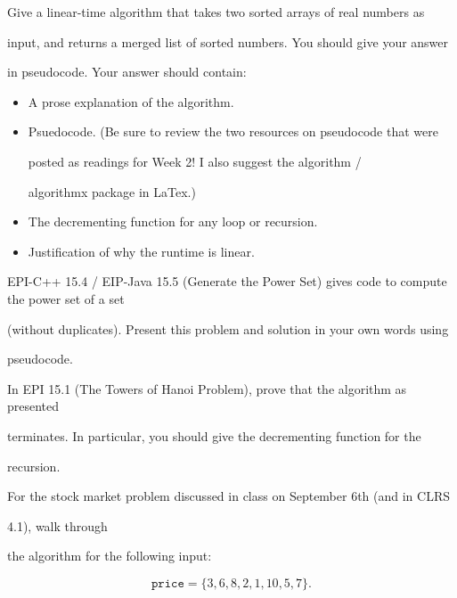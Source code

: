 \documentclass{article}
\author{TODO-Your Group Number and Names Here}
\date{due: 20 September 2019}
\begin{document}
\nextprob

Give a linear-time algorithm that takes two sorted arrays of real numbers as

input, and returns a merged list of sorted numbers.  You should give your answer

in pseudocode.    Your answer should contain:

\begin{itemize}

    \item A prose explanation of the algorithm.

    \item Psuedocode. (Be sure to review the two resources on pseudocode that were

        posted as readings for Week 2!  I also suggest the algorithm /

        algorithmx package in LaTex.)

    \item The decrementing function for any loop or recursion.

    \item Justification of why the runtime is linear.

\end{itemize}



\nextprob

EPI-C++ 15.4 / EIP-Java 15.5 (Generate the Power Set) gives code to compute the power set of a set

(without duplicates).  Present this problem and solution in your own words using

pseudocode.



\nextprob

In EPI 15.1 (The Towers of Hanoi Problem), prove that the algorithm as presented

terminates.  In particular, you should give the decrementing function for the

recursion.



\nextprob

For the stock market problem discussed in class on September 6th (and in CLRS

4.1), walk through

the algorithm for the following input:

$$\mathtt{price} = \{ 3, 6, 8, 2, 1, 10, 5, 7 \}. $$
\end{document}
